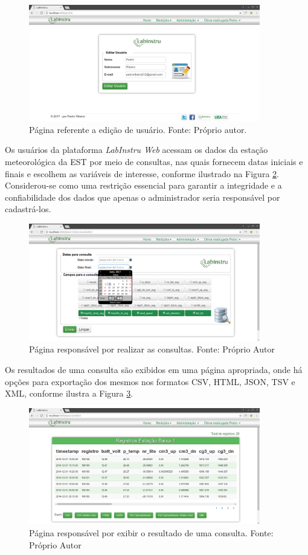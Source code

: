 \begin{figure}[h!]
	\centering
	\includegraphics[width=0.9\textwidth]{./img/ap6.png}
	\caption{Página referente a edição de usuário. Fonte: Próprio autor.} \label{fig:ap6}
\end{figure}

\newpage

Os usuários da plataforma \emph{LabInstru Web} acessam os dados da estação meteorológica da EST por meio de consultas, nas quais fornecem datas iniciais e finais e escolhem as variáveis de interesse, conforme ilustrado na Figura \ref{fig:ap3}. Considerou-se como uma restrição essencial para garantir a integridade e a confiabilidade dos dados que apenas o administrador seria responsável por cadastrá-los.

\begin{figure}[h!]
	\centering
	\includegraphics[width=0.9\textwidth]{./img/ap3.png}
	\caption{Página responsável por realizar as consultas. Fonte: Próprio Autor} \label{fig:ap3}
\end{figure}

Os resultados de uma consulta são exibidos em uma página apropriada, onde há opções para exportação dos mesmos nos formatos CSV, HTML, JSON, TSV e XML, conforme ilustra a Figura \ref{fig:ap7}.

\begin{figure}[h!]
	\centering
	\includegraphics[width=0.9\textwidth]{./img/ap7.png}
	\caption{Página responsável por exibir o resultado de uma consulta. Fonte: Próprio Autor} \label{fig:ap7}
\end{figure}